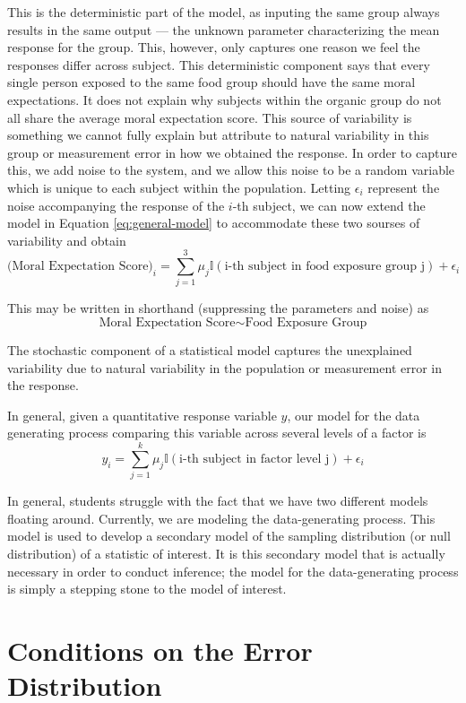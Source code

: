 \documentclass[]{book}
\theoremstyle{definition}
\theoremstyle{definition}
\theoremstyle{remark}
\let\BeginKnitrBlock\begin \let\EndKnitrBlock\end
\begin{document}
This is the deterministic part of the model, as inputing the same group
always results in the same output --- the unknown parameter
characterizing the mean response for the group. This, however, only
captures one reason we feel the responses differ across subject. This
deterministic component says that every single person exposed to the
same food group should have the same moral expectations. It does not
explain why subjects within the organic group do not all share the
average moral expectation score. This source of variability is something
we cannot fully explain but attribute to natural variability in this
group or measurement error in how we obtained the response. In order to
capture this, we add noise to the system, and we allow this noise to be
a random variable which is unique to each subject within the population.
Letting \(\epsilon_i\) represent the noise accompanying the response of
the \(i\)-th subject, we can now extend the model in Equation
\eqref{eq:general-model} to accommodate these two sourses of variability
and obtain \[
\text{(Moral Expectation Score)}_i = \sum_{j=1}^3 \mu_j \mathbb{I}(\text{i-th subject in food exposure group j}) + \epsilon_i
\]

This may be written in shorthand (suppressing the parameters and noise)
as \[ \text{Moral Expectation Score} \sim \text{Food Exposure Group}\]

\BeginKnitrBlock{rmdkeyidea}
The stochastic component of a statistical model captures the unexplained
variability due to natural variability in the population or measurement
error in the response.
\EndKnitrBlock{rmdkeyidea}

\BeginKnitrBlock{rmdtip}
In general, given a quantitative response variable \(y\), our model for
the data generating process comparing this variable across several
levels of a factor is
\[y_i = \sum_{j=1}^k \mu_j \mathbb{I}(\text{i-th subject in factor level j}) + \epsilon_i\]
\EndKnitrBlock{rmdtip}

In general, students struggle with the fact that we have two different
models floating around. Currently, we are modeling the data-generating
process. This model is used to develop a secondary model of the sampling
distribution (or null distribution) of a statistic of interest. It is
this secondary model that is actually necessary in order to conduct
inference; the model for the data-generating process is simply a
stepping stone to the model of interest.

\section{Conditions on the Error
Distribution}\label{conditions-on-the-error-distribution}
\end{document}
